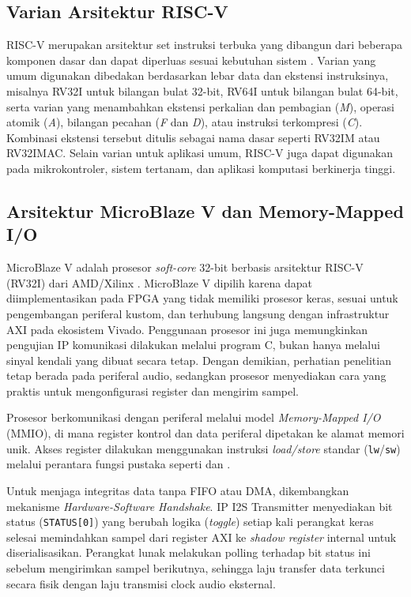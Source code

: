\subsection{Varian Arsitektur RISC-V}

RISC-V merupakan arsitektur set instruksi terbuka yang dibangun dari beberapa komponen dasar dan dapat diperluas sesuai kebutuhan sistem \citep{waterman_riscv_2016}. Varian yang umum digunakan dibedakan berdasarkan lebar data dan ekstensi instruksinya, misalnya RV32I untuk bilangan bulat 32-bit, RV64I untuk bilangan bulat 64-bit, serta varian yang menambahkan ekstensi perkalian dan pembagian (\textit{M}), operasi atomik (\textit{A}), bilangan pecahan (\textit{F} dan \textit{D}), atau instruksi terkompresi (\textit{C}). Kombinasi ekstensi tersebut ditulis sebagai nama dasar seperti RV32IM atau RV32IMAC. Selain varian untuk aplikasi umum, RISC-V juga dapat digunakan pada mikrokontroler, sistem tertanam, dan aplikasi komputasi berkinerja tinggi.

\subsection{Arsitektur MicroBlaze V dan Memory-Mapped I/O}

MicroBlaze V adalah prosesor \textit{soft-core} 32-bit berbasis arsitektur RISC-V (RV32I) dari AMD/Xilinx \citep{xilinx_microblaze_ref_2021}. MicroBlaze V dipilih karena dapat diimplementasikan pada FPGA yang tidak memiliki prosesor keras, sesuai untuk pengembangan periferal kustom, dan terhubung langsung dengan infrastruktur AXI pada ekosistem Vivado. Penggunaan prosesor ini juga memungkinkan pengujian IP komunikasi dilakukan melalui program C, bukan hanya melalui sinyal kendali yang dibuat secara tetap. Dengan demikian, perhatian penelitian tetap berada pada periferal audio, sedangkan prosesor menyediakan cara yang praktis untuk mengonfigurasi register dan mengirim sampel.

Prosesor berkomunikasi dengan periferal melalui model \textit{Memory-Mapped I/O} (MMIO), di mana register kontrol dan data periferal dipetakan ke alamat memori unik. Akses register dilakukan menggunakan instruksi \textit{load/store} standar (\texttt{lw}/\texttt{sw}) melalui perantara fungsi pustaka  seperti  dan .

Untuk menjaga integritas data tanpa FIFO atau DMA, dikembangkan mekanisme \textit{Hardware-Software Handshake}.  IP I2S Transmitter menyediakan bit status (\texttt{STATUS[0]}) yang berubah logika (\textit{toggle}) setiap kali perangkat keras selesai memindahkan sampel dari register AXI ke \textit{shadow register} internal untuk diserialisasikan. Perangkat lunak melakukan polling terhadap bit status ini sebelum mengirimkan sampel berikutnya, sehingga laju transfer data terkunci secara fisik dengan laju transmisi clock audio eksternal.

